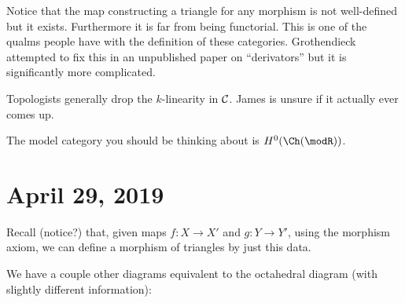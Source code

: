 \documentclass[12pt]{article}
\begin{document}
\begin{rmk}
	Notice that the map constructing a triangle for any morphism is not well-defined but it exists. Furthermore
	it is far from being functorial. This is one of the qualms people have with the definition of these categories.
	Grothendieck attempted to fix this in an unpublished paper on ``derivators'' but it is significantly more complicated.
\end{rmk}
\begin{rmk}
	Topologists generally drop the $k$-linearity in $\cal C$. James is unsure if it actually ever comes up.
\end{rmk}
\begin{rmk}
	The model category you should be thinking about is $H^0(\Ch(\modR))$.
\end{rmk}

\section{April 29, 2019}
Recall (notice?) that, given maps $f:X\to X'$ and $g:Y\to Y'$, using the morphism axiom,
we can define a morphism of triangles by just this data.

We have a couple other diagrams equivalent to the octahedral diagram (with slightly different information):
\begin{center}
\end{center}

\begin{center}
\end{center}
\end{document}
